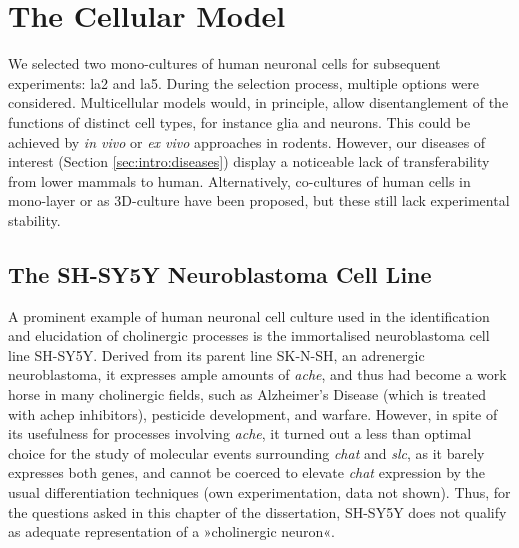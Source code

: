 \section{The Cellular Model}
We selected two mono-cultures of human neuronal cells for subsequent experiments: \acs{la2} and \acs{la5}. During the selection process, multiple options were considered. Multicellular models would, in principle, allow disentanglement of the functions of distinct cell types, for instance glia and neurons. This could be achieved by \emph{in vivo} or \emph{ex vivo} approaches in rodents. However, our diseases of interest (Section \ref{sec:intro:diseases}) display a noticeable lack of transferability from lower mammals to human.\cite{} Alternatively, co-cultures of human cells in mono-layer or as 3D-culture have been proposed, but these still lack experimental stability.

\subsection{The SH-SY5Y Neuroblastoma Cell Line}
A prominent example of human neuronal cell culture used in the identification and elucidation of cholinergic processes is the immortalised neuroblastoma cell line SH-SY5Y.\cite{Biedler1978} Derived from its parent line SK-N-SH, an adrenergic neuroblastoma,\cite{Biedler1973} it expresses ample amounts of \textit{\ac{ache}}, and thus had become a work horse in many cholinergic fields, such as Alzheimer's Disease (which is treated with \ac{achep} inhibitors), pesticide development, and warfare.\cite{} However, in spite of its usefulness for processes involving \textit{\ac{ache}}, it turned out a less than optimal choice for the study of molecular events surrounding \textit{\ac{chat}} and \textit{\ac{slc}}, as it barely expresses both genes,\cite{} and cannot be coerced to elevate \textit{\ac{chat}} expression by the usual differentiation techniques (own experimentation, data not shown). Thus, for the questions asked in this chapter of the dissertation, SH-SY5Y does not qualify as adequate representation of a »cholinergic neuron«.

